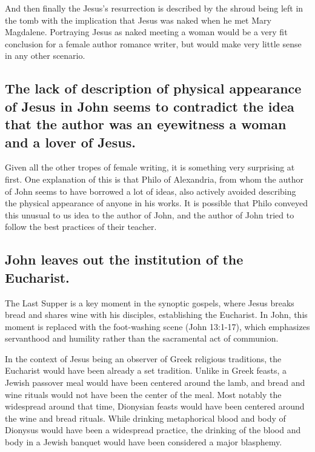 And then finally the Jesus's resurrection is described by the shroud being left in the tomb with the implication that Jesus was naked when he met Mary Magdalene.
Portraying Jesus as naked meeting a woman would be a very fit conclusion for a female author romance writer, but would make very little sense in any other scenario.

\subsection{The lack of description of physical appearance of Jesus in John seems to contradict the idea that the author was an eyewitness a woman and a lover of Jesus.}\label{subsec:the-lack-of-description-of-physical-appearance-of-jesus-in-john-seems-to-contradict-the-idea-that-the-author-was-an-eyewitness-a-woman-and-a-lover-of-jesus.}

Given all the other tropes of female writing, it is something very surprising at first.
One explanation of this is that Philo of Alexandria, from whom the author of John seems to have borrowed a lot of ideas, also actively avoided describing the physical appearance of anyone in his works.
It is possible that Philo conveyed this unusual to us idea to the author of John, and the author of John tried to follow the best practices of their teacher.

\subsection{John leaves out the institution of the Eucharist.}\label{subsec:john-leaves-out-the-institution-of-the-eucharist.}

The Last Supper is a key moment in the synoptic gospels, where Jesus breaks bread and shares wine with his disciples, establishing the Eucharist.
In John, this moment is replaced with the foot-washing scene (John 13:1-17), which emphasizes servanthood and humility rather than the sacramental act of communion.

In the context of Jesus being an observer of Greek religious traditions, the Eucharist would have been already a set tradition.
Unlike in Greek feasts, a Jewish passover meal would have been centered around the lamb, and bread and wine rituals would not have been the center of the meal.
Most notably the widespread around that time, Dionysian feasts would have been centered around the wine and bread rituals.
While drinking metaphorical blood and body of Dionysus would have been a widespread practice, the drinking of the blood and body in a Jewish banquet would have been considered a major blasphemy.

